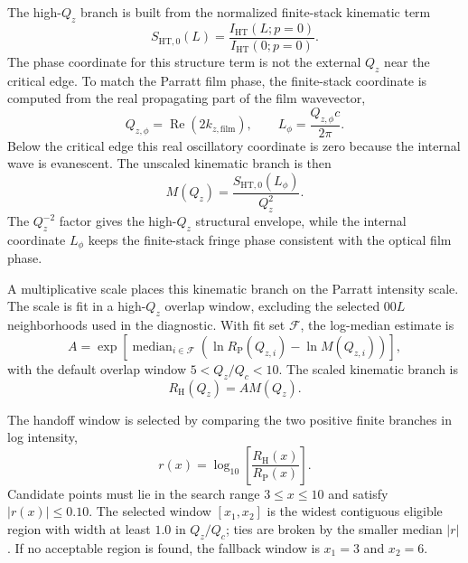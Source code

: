 \documentclass[11pt]{article}
\begin{document}
The high-$Q_z$ branch is built from the normalized finite-stack kinematic term
\begin{equation}
  S_{\mathrm{HT},0}(L)=
  \frac{I_{\mathrm{HT}}(L;p=0)}{I_{\mathrm{HT}}(0;p=0)}.
  \label{eq:si_ht_normalized_structure}
\end{equation}
The phase coordinate for this structure term is not the external $Q_z$ near the
critical edge. To match the Parratt film phase, the finite-stack coordinate is
computed from the real propagating part of the film wavevector,
\begin{equation}
  Q_{z,\phi}=\operatorname{Re}\!\left(2k_{z,\mathrm{film}}\right),
  \qquad
  L_{\phi}=\frac{Q_{z,\phi}c}{2\pi}.
  \label{eq:si_internal_phase_coordinate}
\end{equation}
Below the critical edge this real oscillatory coordinate is zero because the
internal wave is evanescent. The unscaled kinematic branch is then
\begin{equation}
  M(Q_z)=\frac{S_{\mathrm{HT},0}(L_\phi)}{Q_z^2}.
  \label{eq:si_handoff_unscaled_structure}
\end{equation}
The $Q_z^{-2}$ factor gives the high-$Q_z$ structural envelope, while the
internal coordinate $L_\phi$ keeps the finite-stack fringe phase consistent with
the optical film phase.

A multiplicative scale places this kinematic branch on the Parratt intensity
scale. The scale is fit in a high-$Q_z$ overlap window, excluding the selected
$00L$ neighborhoods used in the diagnostic. With fit set $\mathcal F$, the
log-median estimate is
\begin{equation}
  A=
  \exp\!\left[
  \operatorname{median}_{i\in\mathcal F}
  \left(
  \ln R_{\mathrm P}(Q_{z,i})-
  \ln M(Q_{z,i})
  \right)
  \right],
  \label{eq:si_handoff_scale}
\end{equation}
with the default overlap window $5<Q_z/Q_c<10$. The scaled kinematic branch is
\begin{equation}
  R_{\mathrm H}(Q_z)=A M(Q_z).
  \label{eq:si_handoff_scaled_structure}
\end{equation}

The handoff window is selected by comparing the two positive finite branches in
log intensity,
\begin{equation}
  r(x)=\log_{10}\!\left[\frac{R_{\mathrm H}(x)}{R_{\mathrm P}(x)}\right].
  \label{eq:si_handoff_log_ratio}
\end{equation}
Candidate points must lie in the search range $3\le x\le10$ and satisfy
$|r(x)|\le0.10$. The selected window $[x_1,x_2]$ is the widest contiguous
eligible region with width at least $1.0$ in $Q_z/Q_c$; ties are broken by the
smaller median $|r|$. If no acceptable region is found, the fallback window
is $x_1=3$ and $x_2=6$.
\end{document}
